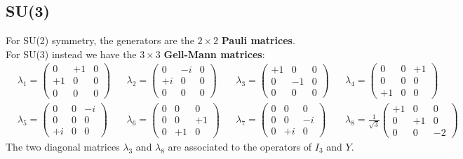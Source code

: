 \documentclass[10.75pt,a4paper,openright,bottom=2cm]{article}
\begin{document}
\subsection{SU(3)}
For SU(2) symmetry, the generators are the $2\times2$ \textbf{Pauli matrices}.\\
For SU(3) instead we have the $3\times3$ \textbf{Gell-Mann matrices}:
\[
\begin{aligned}
&\lambda_1 = \begin{pmatrix} 0 & +1 & 0 \\ +1 & 0 & 0 \\ 0 & 0 & 0 \end{pmatrix} &&\lambda_2 = \begin{pmatrix} 0 & -i & 0 \\ +i & 0 & 0 \\ 0 & 0 & 0 \end{pmatrix} &&\lambda_3 = \begin{pmatrix} +1 & 0 & 0 \\ 0 & -1 & 0 \\ 0 & 0 & 0 \end{pmatrix} &&\lambda_4 = \begin{pmatrix} 0 & 0 & +1 \\ 0 & 0 & 0 \\ +1 & 0 & 0 \end{pmatrix} \\
&\lambda_5 = \begin{pmatrix} 0 & 0 & -i \\ 0 & 0 & 0 \\ +i & 0 & 0 \end{pmatrix} &&\lambda_6 = \begin{pmatrix} 0 & 0 & 0 \\ 0 & 0 & +1 \\ 0 & +1 & 0 \end{pmatrix} &&\lambda_7 = \begin{pmatrix} 0 & 0 & 0 \\ 0 & 0 & -i \\ 0 & +i & 0 \end{pmatrix} &&\lambda_8 = \frac{1}{\sqrt{3}} \begin{pmatrix} +1 & 0 & 0 \\ 0 & +1 & 0 \\ 0 & 0 & -2 \end{pmatrix}
\end{aligned}
\]
The two diagonal matrices $\lambda_3$ and $\lambda_8$ are associated to the operators of $I_3$ and $Y$.\\
\end{document}
